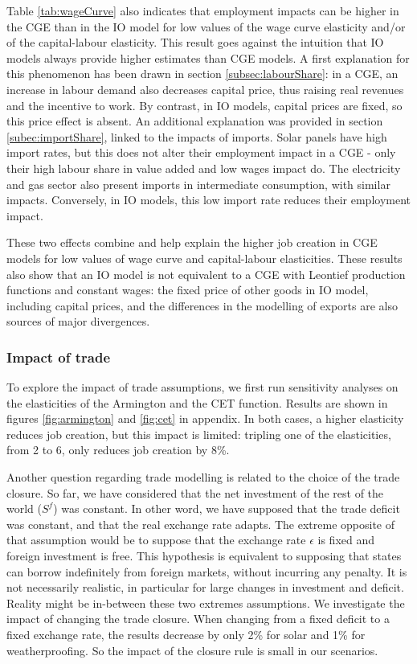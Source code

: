 Table \ref{tab:wageCurve} also indicates that employment impacts can be higher in the CGE than in the IO model for low values of the wage curve elasticity and/or of the capital-labour elasticity.
This result goes against the intuition that IO models always provide higher estimates than CGE models.
A first explanation for this phenomenon has been drawn in section \ref{subsec:labourShare}: in a CGE, an increase in labour demand also decreases capital price, thus raising real revenues and the incentive to work. By contrast, in IO models, capital prices are fixed, so this price effect is absent.
An additional explanation was provided in section \ref{subec:importShare}, linked to the impacts of imports. Solar panels have high import rates, but this does not alter their employment impact in a CGE - only their high labour share in value added and low wages impact do. The electricity and gas sector also present imports in intermediate consumption, with similar impacts. Conversely, in IO models, this low import rate reduces their employment impact.

These two effects combine and help explain the higher job creation in CGE models for low values of wage curve and capital-labour elasticities. These results also show that an IO model is not equivalent to a CGE with Leontief production functions and constant wages: the fixed price of other goods in IO model, including capital prices, and the differences in the modelling of exports are also sources of major divergences.

\subsubsection{Impact of trade}
To explore the impact of trade assumptions, we first run sensitivity analyses on the elasticities of the Armington and the CET function. Results are shown in figures \ref{fig:armington} and \ref{fig:cet} in appendix.
In both cases, a higher elasticity reduces job creation, but this impact is limited: tripling one of the elasticities, from 2 to 6, only reduces job creation by 8\%.

Another question regarding trade modelling is related to the choice of the trade closure. So far, we have considered that the net investment of the rest of the world ($S^f$) was constant. In other word, we have supposed that the trade deficit was constant, and that the real exchange rate adapts.
The extreme opposite of that assumption would be to suppose that the exchange rate $\epsilon$ is fixed and foreign investment is free. This hypothesis is equivalent to supposing that states can borrow indefinitely from foreign markets, without incurring any penalty. It is not necessarily realistic, in particular for large changes in investment and deficit. Reality might be in-between these two extremes assumptions. 
We investigate the impact of changing the trade closure. When changing from a fixed deficit to a fixed exchange rate, the results decrease by only 2\% for solar and 1\% for weatherproofing. So the impact of the closure rule is small in our scenarios.

